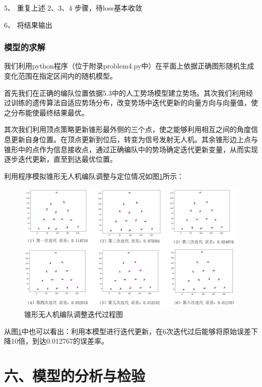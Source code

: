 \documentclass{my_paper}
\begin{document}
$5、$ 重复上述 $2、3、4$ 步骤，待loss基本收敛

$6、$ 将结果输出


\subsubsection{模型的求解}

我们利用python程序（位于附录problem4.py中）在平面上依据正确图形随机生成变化范围在指定区间内的随机模型。

首先我们在正确的编队位置依据5.3中的人工势场模型建立势场。其次我们利用经过训练的遗传算法自适应势场分布，改变势场中迭代更新的向量方向与向量值，使之分布能使最终结果最优。

其次我们利用顶点策略更新锥形最外侧的三个点，使之能够利用相互之间的角度信息更新自身位置。在顶点更新到位后，转变为信号发射无人机。其余锥形边上点与锥形中的点作为信息接收点，通过正确编队中的势场确定迭代更新变量，从而实现逐步迭代更新，直至到达最优位置。

利用程序模拟锥形无人机编队调整与定位情况如图\ref{moxing4}所示：

\begin{figure}[h]
    \centering
    \includegraphics[width=1\textwidth]{images/moxing4.jpg}
    \caption{锥形无人机编队调整迭代过程图}
    \label{moxing4}
\end{figure}

从图\ref{moxing4}中也可以看出：利用本模型进行迭代更新，在6次迭代过后能够将原始误差下降10倍，到达0.012767的误差率。





\section{六、模型的分析与检验}
\end{document}
